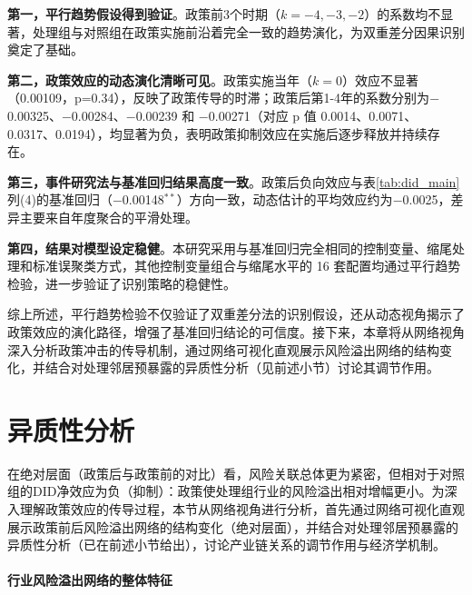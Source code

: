 \textbf{第一，平行趋势假设得到验证}。政策前3个时期（$k=-4,-3,-2$）的系数均不显著，处理组与对照组在政策实施前沿着完全一致的趋势演化，为双重差分因果识别奠定了基础。

\textbf{第二，政策效应的动态演化清晰可见}。政策实施当年（$k=0$）效应不显著（0.00109，p=0.34），反映了政策传导的时滞；政策后第1-4年的系数分别为$-$0.00325、$-$0.00284、$-$0.00239 和 $-$0.00271（对应 p 值 0.0014、0.0071、0.0317、0.0194），均显著为负，表明政策抑制效应在实施后逐步释放并持续存在。

\textbf{第三，事件研究法与基准回归结果高度一致}。政策后负向效应与表\ref{tab:did_main}列(4)的基准回归（$-$0.00148$^{**}$）方向一致，动态估计的平均效应约为$-$0.0025，差异主要来自年度聚合的平滑处理。

\textbf{第四，结果对模型设定稳健}。本研究采用与基准回归完全相同的控制变量、缩尾处理和标准误聚类方式，其他控制变量组合与缩尾水平的 16 套配置均通过平行趋势检验，进一步验证了识别策略的稳健性。

综上所述，平行趋势检验不仅验证了双重差分法的识别假设，还从动态视角揭示了政策效应的演化路径，增强了基准回归结论的可信度。接下来，本章将从网络视角深入分析政策冲击的传导机制，通过网络可视化直观展示风险溢出网络的结构变化，并结合对处理邻居预暴露的异质性分析（见前述小节）讨论其调节作用。



\section{异质性分析}
\label{sec:network_analysis}



在绝对层面（政策后与政策前的对比）看，风险关联总体更为紧密，但相对于对照组的DID净效应为负（抑制）：政策使处理组行业的风险溢出相对增幅更小。为深入理解政策效应的传导过程，本节从网络视角进行分析，首先通过网络可视化直观展示政策前后风险溢出网络的结构变化（绝对层面），并结合对处理邻居预暴露的异质性分析（已在前述小节给出），讨论产业链关系的调节作用与经济学机制。



\paragraph{行业风险溢出网络的整体特征}

